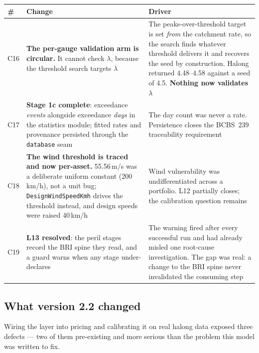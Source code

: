 \documentclass[11pt]{article}
\begin{document}
\begin{longtable}{@{}p{}p{}p{}@{}}
\toprule
\textbf{\#} & \textbf{Change} & \textbf{Driver} \\
\midrule
\endhead
C16 & \textbf{The per-gauge validation arm is circular.} It cannot check
$\lambda$, because the threshold search targets $\lambda$ & The
peaks-over-threshold target is set \emph{from} the catchment rate, so the search
finds whatever threshold delivers it and recovers the seed by construction.
Halong returned 4.48--4.58 against a seed of 4.5. \textbf{Nothing now validates
$\lambda$} \\
\addlinespace
C17 & \textbf{Stage 1c complete}: exceedance \emph{events} alongside exceedance
\emph{days} in the statistics module; fitted rates and provenance persisted
through the \texttt{database} seam & The day count was never a rate.
Persistence closes the BCBS~239 traceability requirement \\
\addlinespace
C18 & \textbf{The wind threshold is traced and now per-asset.} 55.56\,m/s was a
deliberate uniform constant (200\,km/h), not a unit bug;
\texttt{DesignWindSpeedKmh} drives the threshold instead, and design speeds were
raised 40\,km/h & Wind vulnerability was undifferentiated across a portfolio.
L12 partially closes; the calibration question remains \\
\addlinespace
C19 & \textbf{L13 resolved}: the peril stages record the BRI spine they read,
and a guard warns when any stage under-declares & The warning fired after every
successful run and had already misled one root-cause investigation. The gap was
real: a change to the BRI spine never invalidated the consuming step \\
\bottomrule
\end{longtable}

\subsection{What version 2.2 changed}

Wiring the layer into pricing and calibrating it on real halong data exposed
three defects --- two of them pre-existing and more serious than the problem
this model was written to fix.
\end{document}
